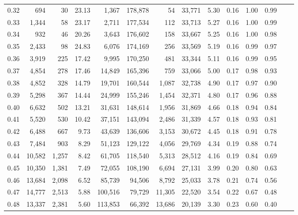 \begin{tabular}{rrrrrrrrrrrrrr}
0.32 &     694 &     30 &   23.13 &    1,367 &  178,878 &      54 &  33,771 &  5.30 &  0.16 &  1.00 &      0.99 \\
0.33 &   1,344 &     58 &   23.17 &    2,711 &  177,534 &     112 &  33,713 &  5.27 &  0.16 &  1.00 &      0.99 \\
0.34 &     932 &     46 &   20.26 &    3,643 &  176,602 &     158 &  33,667 &  5.25 &  0.16 &  1.00 &      0.98 \\
0.35 &   2,433 &     98 &   24.83 &    6,076 &  174,169 &     256 &  33,569 &  5.19 &  0.16 &  0.99 &      0.97 \\
0.36 &   3,919 &    225 &   17.42 &    9,995 &  170,250 &     481 &  33,344 &  5.11 &  0.16 &  0.99 &      0.95 \\
0.37 &   4,854 &    278 &   17.46 &   14,849 &  165,396 &     759 &  33,066 &  5.00 &  0.17 &  0.98 &      0.93 \\
0.38 &   4,852 &    328 &   14.79 &   19,701 &  160,544 &   1,087 &  32,738 &  4.90 &  0.17 &  0.97 &      0.90 \\
0.39 &   5,298 &    367 &   14.44 &   24,999 &  155,246 &   1,454 &  32,371 &  4.80 &  0.17 &  0.96 &      0.88 \\
0.40 &   6,632 &    502 &   13.21 &   31,631 &  148,614 &   1,956 &  31,869 &  4.66 &  0.18 &  0.94 &      0.84 \\
0.41 &   5,520 &    530 &   10.42 &   37,151 &  143,094 &   2,486 &  31,339 &  4.57 &  0.18 &  0.93 &      0.81 \\
0.42 &   6,488 &    667 &    9.73 &   43,639 &  136,606 &   3,153 &  30,672 &  4.45 &  0.18 &  0.91 &      0.78 \\
0.43 &   7,484 &    903 &    8.29 &   51,123 &  129,122 &   4,056 &  29,769 &  4.34 &  0.19 &  0.88 &      0.74 \\
0.44 &  10,582 &  1,257 &    8.42 &   61,705 &  118,540 &   5,313 &  28,512 &  4.16 &  0.19 &  0.84 &      0.69 \\
0.45 &  10,350 &  1,381 &    7.49 &   72,055 &  108,190 &   6,694 &  27,131 &  3.99 &  0.20 &  0.80 &      0.63 \\
0.46 &  13,684 &  2,098 &    6.52 &   85,739 &   94,506 &   8,792 &  25,033 &  3.78 &  0.21 &  0.74 &      0.56 \\
0.47 &  14,777 &  2,513 &    5.88 &  100,516 &   79,729 &  11,305 &  22,520 &  3.54 &  0.22 &  0.67 &      0.48 \\
0.48 &  13,337 &  2,381 &    5.60 &  113,853 &   66,392 &  13,686 &  20,139 &  3.30 &  0.23 &  0.60 &      0.40 \\

\end{tabular}
